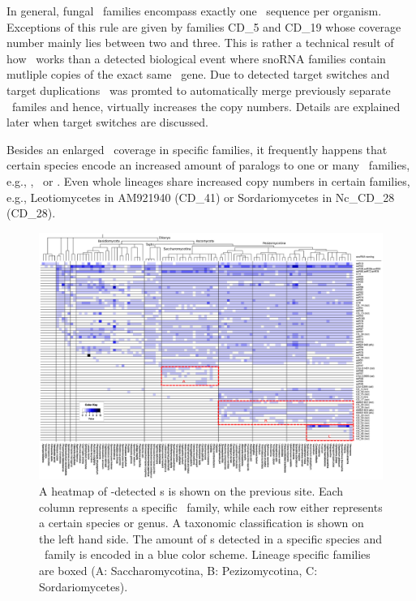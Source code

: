  In general, fungal \sno\
families encompass exactly one \sno\ sequence per organism. Exceptions
of this rule are given by families CD\_5 and CD\_19 whose coverage
number mainly lies between two and three. This is rather a technical
result of how \snostrip\ works than a detected biological event where
snoRNA families contain mutliple copies of the exact same \sno\
gene. Due to detected target switches and target duplications
\snostrip\ was promted to automatically merge previously separate
\sno\ familes and hence, virtually increases the copy numbers. Details
are explained later when target switches are discussed.

Besides an enlarged \sno\ coverage in specific families, it frequently
happens that certain species encode an increased amount of paralogs to
one or many \sno\ families, e.g., \Ppl, \Asp\ or \Nfu. Even whole
lineages share increased copy numbers in certain families, e.g.,
Leotiomycetes in AM921940 (CD\_41) or Sordariomycetes in Nc\_CD\_28
(CD\_28).

\begin{figure}
  \centering
  \includegraphics[width=1.05\textwidth]{pics/CD_snoRNAs_collapsed.short_naming.eps}
  \caption{A heatmap of
    \snostrip-detected \cd s is shown on the previous site. Each column represents a specific \sno\
    family, while each row either represents a certain species or
    genus. A taxonomic classification is shown on the left hand side. The amount of
    \sno s detected in a specific species and \sno\ family is encoded in a
    blue color scheme. Lineage specific families are boxed (A:
    Saccharomycotina, B: Pezizomycotina, C: Sordariomycetes). %
  }
  \label{fig:heatmap_CD_snoRNAs} 
\end{figure}



